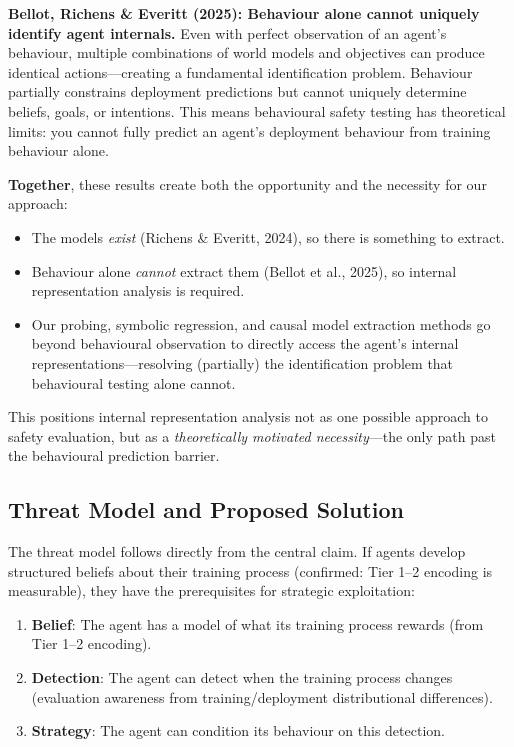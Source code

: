 \documentclass[11pt,a4paper]{article}
\theoremstyle{remark}
\begin{document}
\textbf{Bellot, Richens \& Everitt (2025): Behaviour alone cannot uniquely identify agent internals.} Even with perfect observation of an agent's behaviour, multiple combinations of world models and objectives can produce identical actions---creating a fundamental identification problem. Behaviour partially constrains deployment predictions but cannot uniquely determine beliefs, goals, or intentions. This means behavioural safety testing has theoretical limits: you cannot fully predict an agent's deployment behaviour from training behaviour alone.

\textbf{Together}, these results create both the opportunity and the necessity for our approach:
\begin{itemize}[nosep]
    \item The models \textit{exist} (Richens \& Everitt, 2024), so there is something to extract.
    \item Behaviour alone \textit{cannot} extract them (Bellot et al., 2025), so internal representation analysis is required.
    \item Our probing, symbolic regression, and causal model extraction methods go beyond behavioural observation to directly access the agent's internal representations---resolving (partially) the identification problem that behavioural testing alone cannot.
\end{itemize}

This positions internal representation analysis not as one possible approach to safety evaluation, but as a \textit{theoretically motivated necessity}---the only path past the behavioural prediction barrier.

\subsection{Threat Model and Proposed Solution}

The threat model follows directly from the central claim. If agents develop structured beliefs about their training process (confirmed: Tier 1--2 encoding is measurable), they have the prerequisites for strategic exploitation:
\begin{enumerate}[nosep]
    \item \textbf{Belief}: The agent has a model of what its training process rewards (from Tier 1--2 encoding).
    \item \textbf{Detection}: The agent can detect when the training process changes (evaluation awareness from training/deployment distributional differences).
    \item \textbf{Strategy}: The agent can condition its behaviour on this detection.
\end{enumerate}
\end{document}
